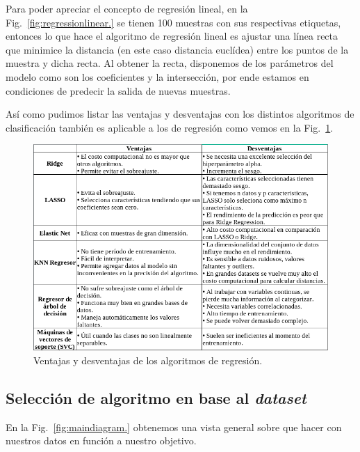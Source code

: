 \documentclass[a4paper,12pt]{article}
\begin{document}
Para poder apreciar el concepto de regresión lineal, en la Fig.~\ref{fig:regressionlinear.} se tienen 100 muestras con sus respectivas etiquetas, entonces lo que hace el algoritmo de regresión lineal es ajustar una línea recta que minimice la distancia (en este caso distancia euclídea) entre los puntos de la muestra y dicha recta. Al obtener la recta, disponemos de los parámetros del modelo como son los coeficientes y la intersección, por ende estamos en condiciones de predecir la salida de nuevas muestras.

Así como pudimos listar las ventajas y desventajas con los distintos algoritmos de clasificación también es aplicable a los de regresión como vemos en la Fig.~\ref{fig:proconsregression.}.

\begin{figure}[H]
	\begin{center}				
		\includegraphics[width=1\textwidth]{tesis_10.png}
		\caption{Ventajas y desventajas de los algoritmos de regresión.}
		\label{fig:proconsregression.}
	\end{center}
\end{figure}

\subsection{Selección de algoritmo en base al \textit{dataset}}
En la Fig.~\ref{fig:maindiagram.} obtenemos una vista general sobre que hacer con nuestros datos en función a nuestro objetivo.
\end{document}
